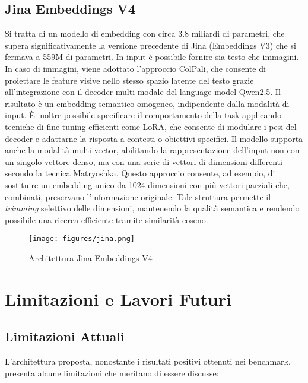 \subsection{Jina Embeddings V4}
Si tratta di un modello di embedding con circa 3.8 miliardi di parametri, che supera significativamente la versione precedente di Jina (Embeddings V3) che si fermava a 559M di parametri. 
In input è possibile fornire sia testo che immagini. In caso di immagini, viene adottato l’approccio ColPali, che consente di proiettare le feature visive nello stesso spazio latente del testo grazie all’integrazione con il decoder multi-modale del language model Qwen2.5. Il risultato è un embedding semantico omogeneo, indipendente dalla modalità di input.
È inoltre possibile specificare il comportamento della task applicando tecniche di fine-tuning efficienti come LoRA, che consente di modulare i pesi del decoder e adattarne la risposta a contesti o obiettivi specifici.
Il modello supporta anche la modalità multi-vector, abilitando la rappresentazione dell’input non con un singolo vettore denso, ma con una serie di vettori di dimensioni differenti secondo la tecnica Matryoshka. Questo approccio consente, ad esempio, di sostituire un embedding unico da 1024 dimensioni con più vettori parziali che, combinati, preservano l’informazione originale. Tale struttura permette il \textit{trimming} selettivo delle dimensioni, mantenendo la qualità semantica e rendendo possibile una ricerca efficiente tramite similarità coseno.

\begin{figure}[!ht]
\centering
\texttt{[image: figures/jina.png]}
\caption{Architettura Jina Embeddings V4}
\end{figure}

\section{Limitazioni e Lavori Futuri}

\subsection{Limitazioni Attuali}
L'architettura proposta, nonostante i risultati positivi ottenuti nei benchmark, presenta alcune limitazioni che meritano di essere discusse:

